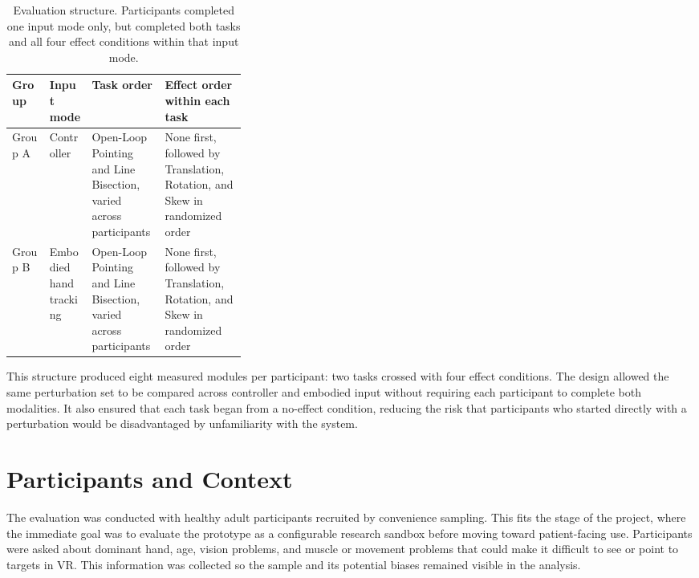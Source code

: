 \begin{table}[H]
    \centering
    \footnotesize
    \setlength{\tabcolsep}{5pt}
    \renewcommand{\arraystretch}{1.18}
    \begin{tabularx}{\linewidth}{|
        >{\raggedright\arraybackslash}p{0.16\linewidth}|
        >{\raggedright\arraybackslash}p{0.18\linewidth}|
        >{\raggedright\arraybackslash}X|
        >{\raggedright\arraybackslash}X|}
        \hline
        \textbf{Group} & \textbf{Input mode} & \textbf{Task order} & \textbf{Effect order within each task} \\
        \hline
        Group A & Controller & Open-Loop Pointing and Line Bisection, varied across participants & None first, followed by Translation, Rotation, and Skew in randomized order \\
        \hline
        Group B & Embodied hand tracking & Open-Loop Pointing and Line Bisection, varied across participants & None first, followed by Translation, Rotation, and Skew in randomized order \\
        \hline
    \end{tabularx}
    \caption{Evaluation structure. Participants completed one input mode only, but completed both tasks and all four effect conditions within that input mode.}
    \label{tab:evaluation-groups}
\end{table}

This structure produced eight measured modules per participant: two tasks crossed with four effect conditions. The design allowed the same perturbation set to be compared across controller and embodied input without requiring each participant to complete both modalities. It also ensured that each task began from a no-effect condition, reducing the risk that participants who started directly with a perturbation would be disadvantaged by unfamiliarity with the system.

\section{Participants and Context}
\label{sec:evaluation-participants}

The evaluation was conducted with healthy adult participants recruited by convenience sampling. This fits the stage of the project, where the immediate goal was to evaluate the prototype as a configurable research sandbox before moving toward patient-facing use. Participants were asked about dominant hand, age, vision problems, and muscle or movement problems that could make it difficult to see or point to targets in VR. This information was collected so the sample and its potential biases remained visible in the analysis.

